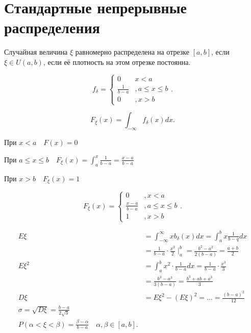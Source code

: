 \section{Стандартные непрерывные распределения}

\begin{definition}
    Случайная величина $\xi$ равномерно распределена на отрезке $[a,b]$, если $\xi\in U(a,b)$, если её плотность на этом отрезке постоянна.

    \[
    f_\delta = \begin{cases}
        0&x<a\\ \frac{1}{b-a}&, a\leqslant x\leqslant b\\ 0&,x>b
    \end{cases}
    .\]
\end{definition}

\begin{note}
   \[
       F_\xi(x) = \int_{-\infty } f_\delta(x)dx
   .\]

   При $x<a\quad F(x) = 0$

   При  $a\leqslant x\leqslant b\quad F_\xi(x) = \int_a^x \frac{1}{b-a} = \frac{x-a}{b-a}$

   При $x>b\quad F_\xi(x) = 1$

    \[
        F_\xi(x) = \begin{cases}
            0&,x<a\\ \frac{x-a}{b-a}&, a \leqslant x\leqslant b\\ 1&, x>b
        \end{cases}
   .\]

   \begin{align*}
       E\xi &= \int_{-\infty }^{\infty}xb_{\delta}(x)dx = \int_a^b x \frac{1}{b-q}dx\\
            &=  \frac{1}{b-a}\cdot \frac{x^2}{2} \mid_a^b = \frac{b^2-a^2}{2(b-a)} = \frac{a+b}{2}\\
         E\xi^2 &= \int_a^b x^2 \cdot \frac{1}{b-a}dx = \frac{1}{b-a}\cdot \frac{x^3}{3} \\
                &= \frac{b^3 - a^3}{3(b-a)} = \frac{b^3+ab+a^3}{3} \\
         D\xi &= E\xi^2 - \left( E\xi \right) ^2 = \ldots = \frac{(b-a)^2}{12}\\
         \sigma = \sqrt{D\xi} = \frac{b-a}{2\sqrt{3} }\\
         P\left( \alpha <\xi<\beta \right)  = \frac{\beta - \alpha}{b-a}\quad \alpha, \beta\in[a,b]
   .\end{align*}
\end{note}

